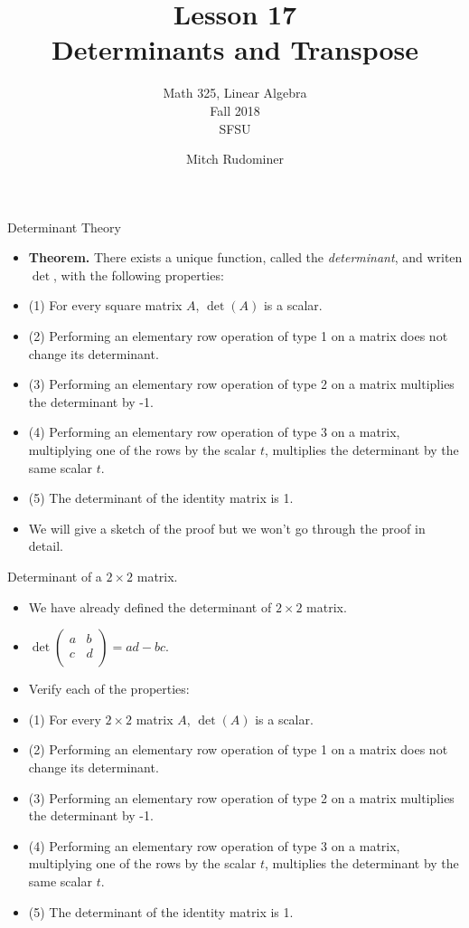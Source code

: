 \documentclass{beamer}
\title{Lesson 17 \\ Determinants and Transpose}
\subtitle{Math 325, Linear Algebra \\ Fall 2018 \\ SFSU}
\author{Mitch Rudominer}
\date{}
\begin{document}
\begin{frame}
  \titlepage
\end{frame}


\begin{frame}{Determinant Theory}

\begin{itemize}
\item \textbf{Theorem.} There exists a unique function, called the \emph{determinant}, and writen $\det$, with the following properties:
\item (1) For every square matrix $A$, $\det(A)$ is a scalar.
\item (2) Performing an elementary row operation of type 1 on a matrix does not change its determinant.
\item (3) Performing an elementary row operation of type 2 on a matrix multiplies the determinant by -1.
\item (4) Performing an elementary row operation of type 3 on a matrix, multiplying one of the rows by the scalar $t$,
multiplies the determinant by the same scalar $t$.
\item (5) The determinant of the identity matrix is 1.
\item We will give a sketch of the proof but we won't go through the proof in detail.
\end{itemize}
\end{frame}


\begin{frame}{Determinant of a $2\times 2$ matrix.}

\begin{itemize}
\item We have already defined the determinant of $2\times 2$ matrix.
\item
$
\det
\begin{pmatrix}
a & b \\
c & d \\
\end{pmatrix}
= ad - bc
$.
\item Verify each of the properties:
\item (1) For every $2\times 2$ matrix $A$, $\det(A)$ is a scalar.
\item (2) Performing an elementary row operation of type 1 on a matrix does not change its determinant.
\item (3) Performing an elementary row operation of type 2 on a matrix multiplies the determinant by -1.
\item (4) Performing an elementary row operation of type 3 on a matrix, multiplying one of the rows by the scalar $t$,
multiplies the determinant by the same scalar $t$.
\item (5) The determinant of the identity matrix is 1.
\end{itemize}
\end{frame}
\end{document}
